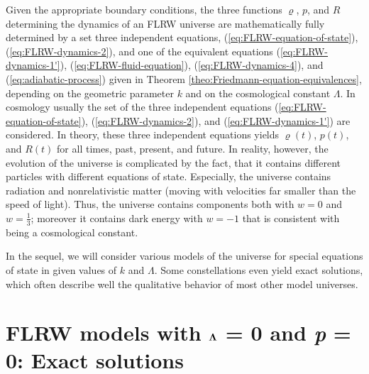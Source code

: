 \begin{bem}
	Given the appropriate boundary conditions, the three functions $\varrho$, $p$, and $R$ determining the dynamics of an FLRW universe are mathematically fully determined by a set three independent equations,
	(\ref{eq:FLRW-equation-of-state}), (\ref{eq:FLRW-dynamics-2}), and one of the equivalent equations
	(\ref{eq:FLRW-dynamics-1'}),
	(\ref{eq:FLRW-fluid-equation}),
	(\ref{eq:FLRW-dynamics-4}),
	and 
	(\ref{eq:adiabatic-process})
	given in Theorem \ref{theo:Friedmann-equation-equivalences},
	depending on the geometric parameter $k$ and on the cosmological constant $\Lambda$.
	In cosmology usually the set of the three independent equations
	(\ref{eq:FLRW-equation-of-state}), (\ref{eq:FLRW-dynamics-2}), and 	 
	(\ref{eq:FLRW-dynamics-1'})
	are considered.
	\cite[69]{Ryden-2017}
	In theory, these three independent equations yields $\varrho(t)$, $p(t)$, and $R(t)$ for all times, past, present, and future. In reality, however, the evolution of the universe is complicated by the fact, that it contains different particles with different equations of state.
	Especially, the universe contains radiation and nonrelativistic matter (moving with velocities far smaller than the speed of light). Thus, the universe contains components both with $w=0$ and $w=\frac{1}{3}$; moreover it contains dark energy with $w=-1$ that is consistent with being a cosmological constant.
	
	In the sequel, we will consider various models of the universe for special equations of state in given values of $k$ and $\Lambda$. Some constellations even yield exact solutions, which often describe well the qualitative behavior of most other model universes.
\end{bem}


\section{FLRW models with $\fettgr{\Lambda}$ = 0 and \textit{p} = 0: Exact solutions}
\label{sec:FLRW-Lambda=0-p=0}

